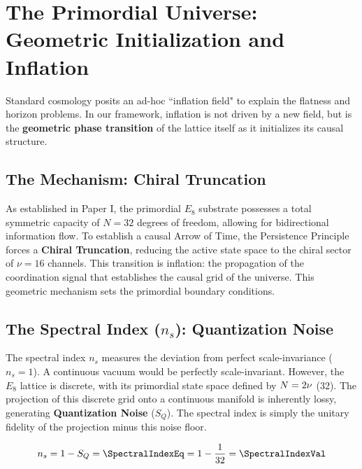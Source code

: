 
\section{The Primordial Universe: Geometric Initialization and Inflation}
Standard cosmology posits an ad-hoc ``inflation field" to explain the flatness and horizon problems. In our framework, inflation is not driven by a new field, but is the \textbf{geometric phase transition} of the lattice itself as it initializes its causal structure.

\subsection{The Mechanism: Chiral Truncation}
As established in Paper I, the primordial $E_8$ substrate possesses a total symmetric capacity of $N=32$ degrees of freedom, allowing for bidirectional information flow. To establish a causal Arrow of Time, the Persistence Principle forces a \textbf{Chiral Truncation}, reducing the active state space to the chiral sector of $\nu=16$ channels. This transition is inflation: the propagation of the coordination signal that establishes the causal grid of the universe. This geometric mechanism sets the primordial boundary conditions.

\subsection{The Spectral Index (\texorpdfstring{$n_s$}{ns}): Quantization Noise}
The spectral index $n_s$ measures the deviation from perfect scale-invariance ($n_s=1$). A continuous vacuum would be perfectly scale-invariant. However, the $E_8$ lattice is discrete, with its primordial state space defined by $N=2\nu \space$ (32). The projection of this discrete grid onto a continuous manifold is inherently lossy, generating \textbf{Quantization Noise} ($S_Q$). The spectral index is simply the unitary fidelity of the projection minus this noise floor.

\begin{equation}
n_s = 1 - S_Q = \SpectralIndexEq = 1 - \frac{1}{32} = \mathbf{\SpectralIndexVal}
\end{equation}

